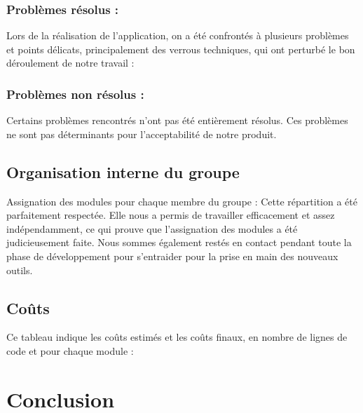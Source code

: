 			\subsubsection*{Problèmes résolus :} 
			Lors de la réalisation de l'application, on a été confrontés à plusieurs problèmes et points délicats, principalement des verrous techniques, qui ont perturbé le bon déroulement de notre travail :
				
			\subsubsection*{Problèmes non résolus :}
				Certains problèmes rencontrés n'ont pas été entièrement résolus. Ces problèmes ne sont pas déterminants pour l'acceptabilité de notre produit.
				
		\subsection{Organisation interne du groupe}
		Assignation des modules pour chaque membre du groupe :
		Cette répartition a été parfaitement respectée. Elle nous a permis de travailler efficacement et assez indépendamment, ce qui prouve que l'assignation des modules a été judicieusement faite. Nous sommes également restés en contact pendant toute la phase de développement pour s'entraider pour la prise en main des nouveaux outils.
	
		\subsection{Coûts}
		Ce tableau indique les coûts estimés et les coûts finaux, en nombre de lignes de code et pour chaque module :
	
	\section*{Conclusion}
	
		

